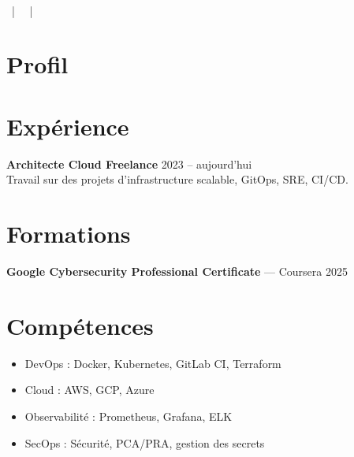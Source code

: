 \documentclass[a4paper,10pt]{article}
\begin{document}
\begin{center}
    {\LARGE \textbf{\myname}} \\
    \href{mailto:\mymail}{\mymail} ~|~
    \href{https://\mygithub}{\mygithub} ~|~
    \mylocation
\end{center}

\vspace{0.5cm}

\section*{Profil}
\myprofil

\section*{Expérience}

\textbf{Architecte Cloud Freelance} \hfill 2023 – aujourd’hui \\
Travail sur des projets d’infrastructure scalable, GitOps, SRE, CI/CD.

\section*{Formations}

\textbf{Google Cybersecurity Professional Certificate} — Coursera \hfill 2025

\section*{Compétences}

\begin{itemize}[leftmargin=1.2em]
    \item DevOps : Docker, Kubernetes, GitLab CI, Terraform
    \item Cloud : AWS, GCP, Azure
    \item Observabilité : Prometheus, Grafana, ELK
    \item SecOps : Sécurité, PCA/PRA, gestion des secrets
\end{itemize}
\end{document}
